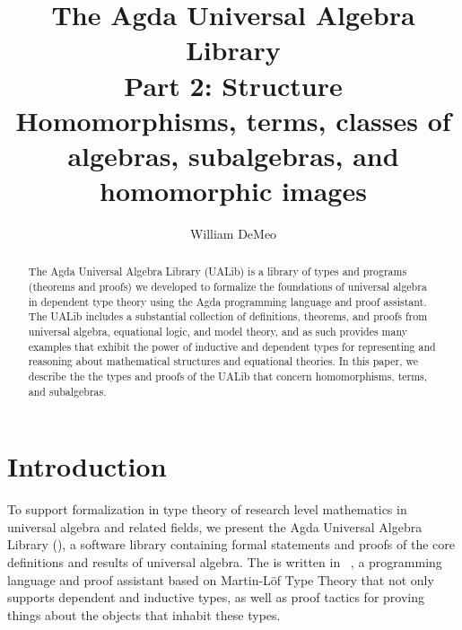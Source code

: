 \documentclass[a4paper,UKenglish,cleveref,autoref,thm-restate,12pt]{../lipics-v2021-wjd}
\title{The Agda Universal Algebra Library\\%
Part 2: Structure\\[-5pt]
{\large Homomorphisms, terms, classes of algebras, subalgebras, and homomorphic images}}
\author{William DeMeo}
       {Department of Algebra, Charles University in Prague \and \url{https://williamdemeo.gitlab.io}}
       {williamdemeo@gmail.com}{https://orcid.org/0000-0003-1832-5690}{}
\begin{document}
\maketitle


\begin{abstract}
The Agda Universal Algebra Library (UALib) is a library of types and programs (theorems and proofs) we developed to formalize the foundations of universal algebra in dependent type theory using the Agda programming language and proof assistant. 
 The UALib includes a substantial collection of definitions, theorems, and proofs from universal algebra, equational logic, and model theory, and as such provides many examples that exhibit the power of inductive and dependent types for representing and reasoning about mathematical structures and equational theories. In this paper, we describe the the types and proofs of the UALib that concern homomorphisms, terms, and subalgebras.
\end{abstract}

% 


\setcounter{tocdepth}{2}
\tableofcontents


\section{Introduction}\label{sec:introduction}
To support formalization in type theory of research level mathematics in universal algebra and related fields, we present the Agda Universal Algebra Library (\agdaualib), a software library containing formal statements and proofs of the core definitions and results of universal algebra. 
The \ualib is written in \agda~\cite{Norell:2009}, a programming language and proof assistant based on Martin-L\"of Type Theory that not only supports dependent and inductive types, as well as proof tactics for proving things about the objects that inhabit these types.
\end{document}
